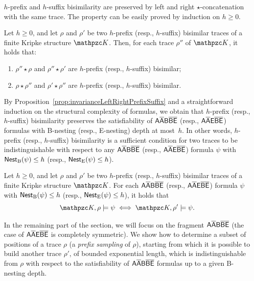 $h$-prefix and $h$-suffix bisimilarity are preserved by left and right $\star$-concatena\-tion with the same trace. The property can be easily proved by induction on $h\geq 0$.

\begin{proposition}\label{prop:invarianceLeftRightPrefixSuffix} Let $h\geq 0$, and let $\rho$ and $\rho'$ be two $h$-prefix (resp., $h$-suffix) bisimilar traces of a finite Kripke structure $\Ku$. Then, for each trace $\rho''$ of $\Ku$, it holds that:
\begin{enumerate}
  \item $\rho''\star \rho$ and $\rho''\star \rho'$ are $h$-prefix (resp., $h$-suffix) bisimilar;
  \item $\rho\star \rho''$ and $\rho'\star \rho''$ are $h$-prefix (resp., $h$-suffix) bisimilar.
\end{enumerate}
\end{proposition}

By Proposition~\ref{prop:invarianceLeftRightPrefixSuffix} and a straightforward induction on the structural complexity of formulas, we obtain that $h$-prefix (resp., $h$-suffix) bisimilarity preserves the satisfiability of $\mathsf{A\overline{A}B\overline{B}\overline{E}}$ (resp., $\mathsf{A\overline{A}E\overline{B}\overline{E}}$) formulas with B-nesting (resp., E-nesting) depth at most~$h$. In other words, $h$-prefix (resp., $h$-suffix) bisimilarity is a sufficient condition for two traces to be indistinguishable with respect to any $\mathsf{A\overline{A}B\overline{B}\overline{E}}$ (resp., $\mathsf{A\overline{A}E\overline{B}\overline{E}}$) formula $\psi$ with $\operatorname{\mathsf{Nest}_B}(\psi)\leq h$ (resp., $\operatorname{\mathsf{Nest}_E}(\psi)\leq h$).

\begin{proposition}\label{prop:fulfillmentPreservingSuffixPrefix} Let $h\geq 0$, and let $\rho$ and $\rho'$ be two $h$-prefix (resp., $h$-suffix)  bisimilar traces of a finite Kripke structure $\Ku$. 
For each $\mathsf{A\overline{A}B\overline{B}\overline{E}}$ (resp., $\mathsf{A\overline{A}E\overline{B}\overline{E}}$) formula $\psi$ with $\operatorname{\mathsf{Nest}_B}(\psi)\leq h$ (resp., $\operatorname{\mathsf{Nest}_E}(\psi)\leq h$), it holds that 
\[\Ku,\rho\models\psi\iff \Ku,\rho'\models\psi.\]
\end{proposition}

%

In the remaining part of the section, we will focus on the fragment $\mathsf{A\overline{A}B\overline{B}\overline{E}}$ (the case of $\mathsf{A\overline{A}E\overline{B}\overline{E}}$ is completely symmetric). We show how to determine a subset of positions of a trace $\rho$ (a \emph{prefix sampling} of $\rho$), starting from which it is possible to build another trace $\rho'$, of bounded exponential length, which is indistinguishable from $\rho$ with respect to the satisfiability of $\mathsf{A\overline{A}B\overline{B}\overline{E}}$ formulas up to a given B-nesting depth. %

